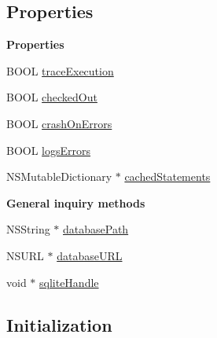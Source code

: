 \subsection*{Properties}
\begin{Indent}\textbf{ Properties}\par
{\em 

 

 }\begin{DoxyCompactItemize}
\item 
B\+O\+OL \mbox{\hyperlink{interface_o_p_t_l_y_f_m_d_b_database_a498285315912a9465dd182db98395f14}{trace\+Execution}}
\item 
B\+O\+OL \mbox{\hyperlink{interface_o_p_t_l_y_f_m_d_b_database_a2962c4e030eb187582879f45745b7824}{checked\+Out}}
\item 
B\+O\+OL \mbox{\hyperlink{interface_o_p_t_l_y_f_m_d_b_database_aaa9eea76060a763d104644f2ab490d45}{crash\+On\+Errors}}
\item 
B\+O\+OL \mbox{\hyperlink{interface_o_p_t_l_y_f_m_d_b_database_a80ce796b9a9582c2be9ce9563988c517}{logs\+Errors}}
\item 
N\+S\+Mutable\+Dictionary $\ast$ \mbox{\hyperlink{interface_o_p_t_l_y_f_m_d_b_database_a25e5eb9e27622135363052a7d12bcebe}{cached\+Statements}}
\end{DoxyCompactItemize}
\end{Indent}
\begin{Indent}\textbf{ General inquiry methods}\par
{\em 

 

 }\begin{DoxyCompactItemize}
\item 
N\+S\+String $\ast$ \mbox{\hyperlink{interface_o_p_t_l_y_f_m_d_b_database_a3406fc73143884735d193f37bff82923}{database\+Path}}
\item 
N\+S\+U\+RL $\ast$ \mbox{\hyperlink{interface_o_p_t_l_y_f_m_d_b_database_a94c6a37fcaadbc2b48772903b2a12eed}{database\+U\+RL}}
\item 
void $\ast$ \mbox{\hyperlink{interface_o_p_t_l_y_f_m_d_b_database_ac63c7ff97fef8256e42d286f0f9962de}{sqlite\+Handle}}
\end{DoxyCompactItemize}
\end{Indent}
\subsection*{Initialization}
\label{_amgrp61bcd96a2c1f8026527cbf2019d6e9a4}%



